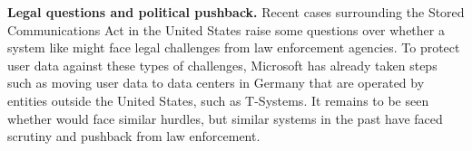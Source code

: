 \textbf{Legal questions and political pushback.} Recent cases surrounding
the Stored Communications Act in the United States raise some questions over
whether a system like \system{} might face legal challenges from law
enforcement agencies. To protect user data against these types of challenges,
Microsoft has already taken steps such as moving user data to data centers in
Germany that are operated by entities outside the United States, such as
T-Systems. It remains to be seen whether \system{} would face similar
hurdles, but similar systems in the past have faced scrutiny and pushback from law
enforcement.
